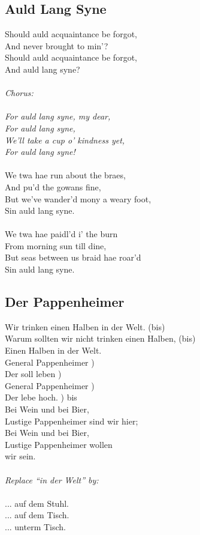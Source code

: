 \documentclass[a5paper]{article}
\begin{document}

\subsection{Auld Lang Syne} %
\label{sub:auld_lang_syne}

Should auld acquaintance be forgot,\\
And never brought to min’?\\
Should auld acquaintance be forgot,\\
And auld lang syne?\\
\\
\textit{Chorus:\\
\\
For auld lang syne, my dear,\\
For auld lang syne,\\
We'll take a cup o’ kindness yet,\\
For auld lang syne!\\}
\\
We twa hae run about the braes,\\
And pu'd the gowans fine,\\
But we've wander'd mony a weary foot,\\
Sin auld lang syne.\\
\\
We twa hae paidl'd i’ the burn\\
From morning sun till dine,\\
But seas between us braid hae roar'd\\
Sin auld lang syne.\\


\newpage

\subsection{Der Pappenheimer} %
\label{sub:der_pappenheimer}

Wir trinken einen Halben in der Welt. (bis)\\
Warum sollten wir nicht trinken einen Halben, (bis)\\
Einen Halben in der Welt.\\
General Pappenheimer 	)\\
Der soll leben 		)\\
General Pappenheimer 	)\\
Der lebe hoch. 		) bis\\
Bei Wein und bei Bier,\\
Lustige Pappenheimer sind wir hier;\\
Bei Wein und bei Bier,\\
Lustige Pappenheimer wollen \\wir sein.\\
\\
\textit{Replace ``in der Welt'' by:}\\
\\
... auf dem Stuhl.\\
... auf dem Tisch.\\
... unterm Tisch.\\
\end{document}
